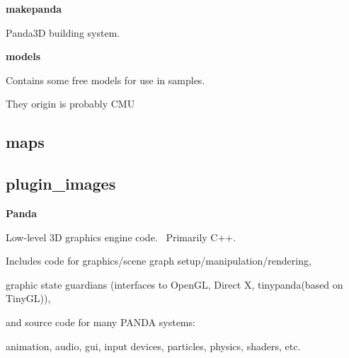 \documentclass[a4paper]{article}
\begin{document}
\bigskip


\bigskip

{\centering\sffamily\bfseries
\hypertarget{RefHeading20511167907073}{}makepanda
\par}

{\centering\color{black}
Panda3D building system.
\par}

\clearpage
\bigskip


\bigskip

{\centering\sffamily\bfseries
\hypertarget{RefHeading20531167907073}{}models
\par}

{\centering\color{black}
Contains some free models for use in samples.
\par}

{\centering\color{black}
They origin is probably CMU
\par}

\clearpage\subsection[maps]{maps}
\hypertarget{RefHeading20551167907073}{}\clearpage\subsection[plugin\_images]{plugin\_images}
\hypertarget{RefHeading20571167907073}{}\clearpage
\bigskip


\bigskip

{\centering\sffamily\bfseries
\hypertarget{RefHeading20611167907073}{}Panda
\par}

{\centering
Low-level 3D graphics engine code. \ Primarily C++. 
\par}

{\centering
Includes code for graphics/scene graph setup/manipulation/rendering,
\par}

{\centering
graphic state guardians (interfaces to OpenGL, Direct X, tinypanda(based on TinyGL)), 
\par}

{\centering
and source code for many PANDA systems:
\par}

{\centering
animation, audio, gui, input devices, particles, physics, shaders, etc.
\par}

\clearpage
\bigskip
\end{document}
